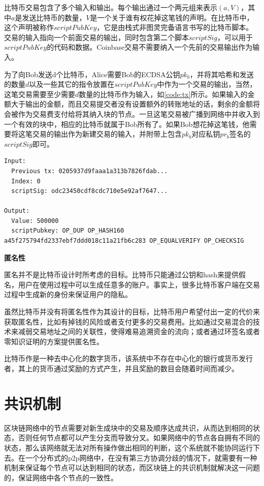 比特币交易包含了多个输入和输出。每个输出通过一个两元组来表示$(a,V)$，其中$a$是发送比特币的数量，$V$是一个关于谁有权花掉这笔钱的声明。在比特币中，这个声明被称作$scriptPubKey$，它是由栈式非图灵完备语言书写的比特币脚本。交易的输入指向一个前面交易的输出，同时包含第二个脚本$scriptSig$，可以用于$scriptPubKey$的代码和数据。Coinbase交易不需要纳入一个先前的交易输出作为输入。

为了向Bob发送d个比特币，Alice需要Bob的ECDSA公钥$pk_b$，并将其哈希和发送的数量$d$以及一些其它的指令放置在$scriptPubKey$中作为一个交易的输出，当然，这笔交易需要至少需要$d$数量的比特币作为输入，如\ref{code:tx}所示。如果输入的金额大于输出的金额，而且交易提交者没有设置额外的转账地址的话，剩余的金额将会被作为交易费支付给将其纳入块的节点。一旦这笔交易被广播到网络中并收入到一个有效的块中，相应的比特币就属于Bob所有了。如果Bob想花掉这笔钱，他需要将这笔交易的输出作为新建交易的输入，并附带上包含$pk_b$对应私钥$pr_b$签名的$scriptSig$即可。

\begin{lstlisting}[caption={比特币交易实例}, label=code:tx]
Input:
  Previous tx: 0205937d9faaa1a313b7826fdab...
  Index: 0
  scriptSig: odc23450cdf8cdc710e5e92af7647...

Output:
  Value: 500000
  scriptPubkey: OP_DUP OP_HASH160 a45f275794fd2337ebf7ddd018c11a21fb6c283 OP_EQUALVERIFY OP_CHECKSIG

\end{lstlisting}


\noindent\textbf{匿名性}

匿名并不是比特币设计时所考虑的目标。比特币只能通过公钥和hash来提供假名，用户在使用过程中可以生成任意多的账户。事实上，很多比特币客户端在交易过程中生成新的身份来保证用户的隐私。

虽然比特币并没有将匿名性作为其设计的目标，比特币用户希望付出一定的代价来获取匿名性，比如有掉钱的风险或者支付更多的交易费用。比如通过交易混合\cite{bonneau2014mixcoin}的技术来减弱交易地址之间的关联性，使得难易追溯资金的流向；或者通过环签名或者零知识证明\cite{kosba2016hawk}的方案提供匿名性。


比特币作是一种去中心化的数字货币，该系统中不存在中心化的银行或货币发行者，其上的货币通过奖励的方式产生，并且奖励的数目会随着时间而减少。

\section{共识机制}

区块链网络中的节点需要对新生成块中的交易及顺序达成共识，从而达到相同的状态，否则任何节点都可以产生分支而导致分叉。如果网络中的节点各自拥有不同的状态，那么该网络就无法对所有操作做出相同的判断，这个系统就不能协同运行下去。在一个分布式的p2p网络中，在没有第三方协调分歧的情况下，就需要有一种机制来保证每个节点可以达到相同的状态，而区块链上的共识机制就解决这一问题的，保证网络中各个节点的一致性。

